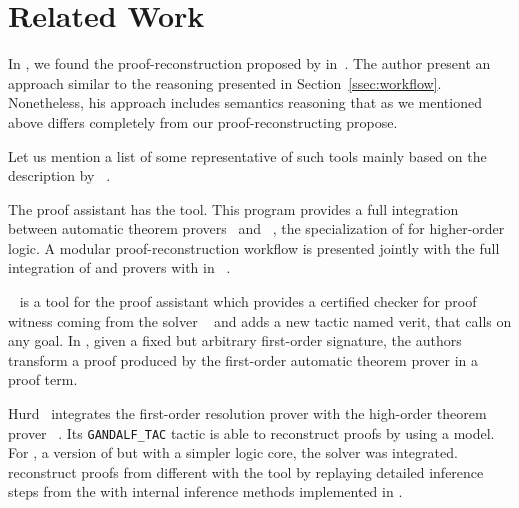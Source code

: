 \documentclass[../main.tex]{subfiles}
\begin{document}

\section{Related Work}
\label{sec:related-work}

In \Agda, we found the proof-reconstruction proposed by \citeauthor{Kanso2012}
in~\cite{Kanso2012,kanso2016light}. The author present an approach similar to
the reasoning presented in Section~\ref{ssec:workflow}.
Nonetheless, his approach includes semantics reasoning that as we mentioned
above differs completely from our proof-reconstructing propose.


Let us mention a list of some representative of such tools mainly based on the
description by \citeauthor{Sicard-Ramirez2016}~\cite{Sicard-Ramirez2016}.

The  proof assistant has the  tool.
This program provides a full integration between
automatic theorem provers~\cite{meng2006automation,blanchette2013extending,Fleury2014,hurlin07practical,bohme2010,blanchette2013extending} and
~\cite{nipkow2002isabelle}, the specialization of
 for higher-order logic.
A modular proof-reconstruction workflow is presented jointly with
the full integration of  and  provers with
 in \citeauthor{Een2004}~\cite{Een2004}.

~\cite{armand2011,Ekici2017} is a tool for the
 proof assistant \cite{coqteam} which provides a certified
checker for proof witness coming from the \SMT solver
~\cite{bouton2009} and adds a new tactic named verit,
that calls  on any  goal.
In \cite{Bezem2002},
given a fixed but arbitrary first-order signature, the authors
transform a proof produced by the first-order automatic theorem
prover  \cite{deNivelle2003} in a  proof
term.

Hurd~\cite{Hurd1999} integrates the first-order resolution prover
 with the high-order
theorem prover ~\cite{norrish2007hol}.
Its \verb!GANDALF_TAC! tactic is able to reconstruct  proofs
by using a  model. For , a version of
 but with a simpler logic core, the \SMT solver 
was integrated. \citeauthor{kaliszyk2013}~\cite{kaliszyk2013}
reconstruct proofs from different \ATPs with the  tool by
replaying detailed inference steps from the \ATPs with internal
inference methods implemented in .
\end{document}
